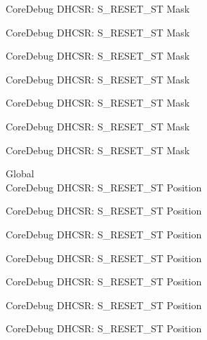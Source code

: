 \begin{DoxyRefList}
\label{deprecated__deprecated000110}%
%
Core\+Debug DHCSR\+: S\+\_\+\+RESET\+\_\+\+ST Mask 

\label{deprecated__deprecated000164}%
%
Core\+Debug DHCSR\+: S\+\_\+\+RESET\+\_\+\+ST Mask 

\label{deprecated__deprecated000249}%
%
Core\+Debug DHCSR\+: S\+\_\+\+RESET\+\_\+\+ST Mask 

\label{deprecated__deprecated000306}%
%
Core\+Debug DHCSR\+: S\+\_\+\+RESET\+\_\+\+ST Mask 

\label{deprecated__deprecated000382}%
%
Core\+Debug DHCSR\+: S\+\_\+\+RESET\+\_\+\+ST Mask 

\label{deprecated__deprecated000461}%
%
Core\+Debug DHCSR\+: S\+\_\+\+RESET\+\_\+\+ST Mask 

\label{deprecated__deprecated000563}%
%
Core\+Debug DHCSR\+: S\+\_\+\+RESET\+\_\+\+ST Mask  
\item[Global \doxylink{group___c_m_s_i_s___core_debug_ga6f934c5427ea057394268e541fa97753}{Core\+Debug\+\_\+\+DHCSR\+\_\+\+S\+\_\+\+RESET\+\_\+\+ST\+\_\+\+Pos} ]\hfill \\
\label{deprecated__deprecated000009}%
%
Core\+Debug DHCSR\+: S\+\_\+\+RESET\+\_\+\+ST Position 

\label{deprecated__deprecated000109}%
%
Core\+Debug DHCSR\+: S\+\_\+\+RESET\+\_\+\+ST Position 

\label{deprecated__deprecated000163}%
%
Core\+Debug DHCSR\+: S\+\_\+\+RESET\+\_\+\+ST Position 

\label{deprecated__deprecated000248}%
%
Core\+Debug DHCSR\+: S\+\_\+\+RESET\+\_\+\+ST Position 

\label{deprecated__deprecated000305}%
%
Core\+Debug DHCSR\+: S\+\_\+\+RESET\+\_\+\+ST Position 

\label{deprecated__deprecated000381}%
%
Core\+Debug DHCSR\+: S\+\_\+\+RESET\+\_\+\+ST Position 

\label{deprecated__deprecated000460}%
%
Core\+Debug DHCSR\+: S\+\_\+\+RESET\+\_\+\+ST Position 


\end{DoxyRefList}

